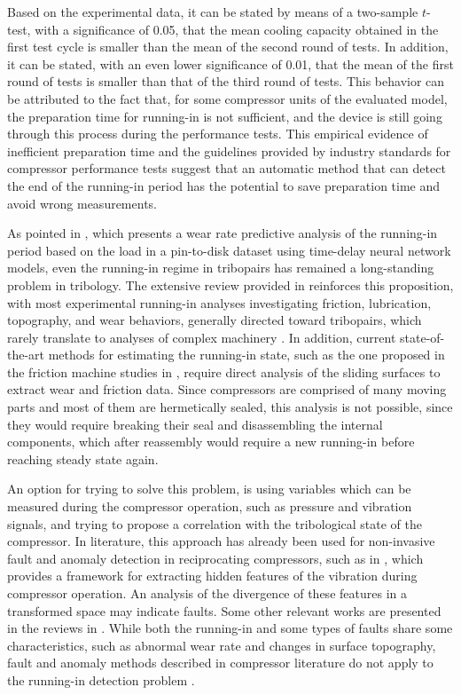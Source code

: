 \documentclass[preprint,11pt,number]{elsarticle}
\begin{document}
Based on the experimental data, it can be stated by means of a two-sample $t$-test, with a significance of 0.05, that the mean cooling capacity obtained in the first test cycle is smaller than the mean of the second round of tests. In addition, it can be stated, with an even lower significance of 0.01, that the mean of the first round of tests is smaller than that of the third round of tests. This behavior can be attributed to the fact that, for some compressor units of the evaluated model, the preparation time for running-in is not sufficient, and the device is still going through this process during the performance tests. This empirical evidence of inefficient preparation time and the guidelines provided by industry standards for compressor performance tests \cite{ASHRAE2005,ISO917} suggest that an automatic method that can detect the end of the running-in period has the potential to save preparation time and avoid wrong measurements.

As pointed in \cite{Argatov2023}, which presents a wear rate predictive analysis of the running-in period based on the load in a pin-to-disk dataset using time-delay neural network models, even the running-in regime in tribopairs has remained a long-standing problem in tribology. The extensive review provided in \cite{Khonsari2021} reinforces this proposition, with most experimental running-in analyses investigating friction, lubrication, topography, and wear behaviors, generally directed toward tribopairs, which rarely translate to analyses of complex machinery \cite{Blau1991}. In addition, current state-of-the-art methods for estimating the running-in state, such as the one proposed in the friction machine studies in \cite{Vojtov2019}, require direct analysis of the sliding surfaces to extract wear and friction data. Since compressors are comprised of many moving parts and most of them are hermetically sealed, this analysis is not possible, since they would require breaking their seal and disassembling the internal components, which after reassembly would require a new running-in before reaching steady state again.

An option for trying to solve this problem, is using variables which can be measured during the compressor operation, such as pressure and vibration signals, and trying to propose a correlation with the tribological state of the compressor. In literature, this approach has already been used for non-invasive fault and anomaly detection in reciprocating compressors, such as in \cite{Zhang2022MSSP}, which provides a framework for extracting hidden features of the vibration during compressor operation. An analysis of the divergence of these features in a transformed space may indicate faults. Some other relevant works are presented in the reviews in \cite{Gangsar2020, Gangsar2022}. While both the running-in and some types of faults share some characteristics, such as abnormal wear rate and changes in surface topography, fault and anomaly methods described in compressor literature do not apply to the running-in detection problem \cite{Blau2005}.
\end{document}
